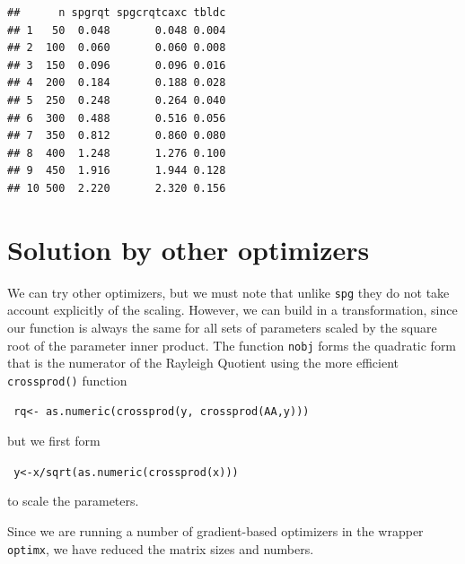 \documentclass[10pt]{article}\usepackage[]{graphicx}\usepackage[]{color}
\makeatletter
\newenvironment{kframe}{%
 \def\at@end@of@kframe{}%
 \ifinner\ifhmode%
  \def\at@end@of@kframe{\end{minipage}}%
  \begin{minipage}{\columnwidth}%
 \fi\fi%
 \def\FrameCommand##1{\hskip\@totalleftmargin \hskip-\fboxsep
 \colorbox{shadecolor}{##1}\hskip-\fboxsep
     \hskip-\linewidth \hskip-\@totalleftmargin \hskip\columnwidth}%
 \MakeFramed {\advance\hsize-\width
   \@totalleftmargin\z@ \linewidth\hsize
   \@setminipage}}%
 {\par\unskip\endMakeFramed%
 \at@end@of@kframe}
\newenvironment{knitrout}{}{} %
\newcommand{\code}[1]{{\tt #1}}
\makeatother
\begin{document}
\begin{knitrout}\scriptsize
{}\color{fgcolor}\begin{kframe}
\begin{verbatim}
##      n spgrqt spgcrqtcaxc tbldc
## 1   50  0.048       0.048 0.004
## 2  100  0.060       0.060 0.008
## 3  150  0.096       0.096 0.016
## 4  200  0.184       0.188 0.028
## 5  250  0.248       0.264 0.040
## 6  300  0.488       0.516 0.056
## 7  350  0.812       0.860 0.080
## 8  400  1.248       1.276 0.100
## 9  450  1.916       1.944 0.128
## 10 500  2.220       2.320 0.156
\end{verbatim}
\end{kframe}
\end{knitrout}


\section{Solution by other optimizers}

We can try other optimizers, but we must note that unlike \code{spg} they 
do not take account explicitly of the scaling. However, we can build in a transformation, 
since our function is always the same for all sets of parameters scaled by the
square root of the parameter inner product. The function \code{nobj} forms the
quadratic form that is the numerator of the Rayleigh Quotient using the more 
efficient \code{crossprod()} function

\code{    rq<- as.numeric(crossprod(y, crossprod(AA,y))) }

but we first form

\code{    y<-x/sqrt(as.numeric(crossprod(x))) }

to scale the parameters. 

Since we are running a number of gradient-based optimizers in the wrapper
\code{optimx}, we have reduced the matrix sizes and numbers.
\end{document}
